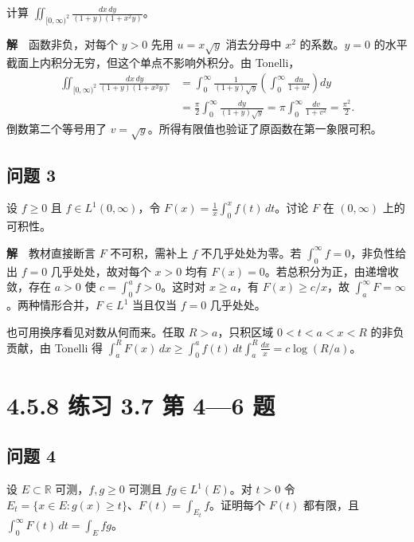 \documentclass[11pt,a4paper]{article}
\begin{document}
计算 \(\iint_{[0,\infty)^2}\frac{dx\,dy}{(1+y)(1+x^2y)}\)。

\textbf{解}　函数非负，对每个 \(y>0\) 先用 \(u=x\sqrt y\) 消去分母中
\(x^2\) 的系数。\(y=0\)
的水平截面上内积分无穷，但这个单点不影响外积分。由 Tonelli， \begin{equation*}
\begin{aligned}
\iint_{[0,\infty)^2}\frac{dx\,dy}{(1+y)(1+x^2y)}
&=\int_0^\infty\frac{1}{(1+y)\sqrt y}
       \left(\int_0^\infty\frac{du}{1+u^2}\right)dy\\
&=\frac{\pi}{2}\int_0^\infty\frac{dy}{(1+y)\sqrt y}
=\pi\int_0^\infty\frac{dv}{1+v^2}=\frac{\pi^2}{2}.
\end{aligned}
\end{equation*} 倒数第二个等号用了
\(v=\sqrt y\)。所得有限值也验证了原函数在第一象限可积。

\subsection{问题 3}\label{ux95eeux9898-3}

设 \(f\ge0\) 且 \(f\in L^1(0,\infty)\)，令
\(F(x)=\frac1x\int_0^x f(t)\,dt\)。讨论 \(F\) 在 \((0,\infty)\)
上的可积性。

\textbf{解}　教材直接断言 \(F\) 不可积，需补上 \(f\) 不几乎处处为零。若
\(\int_0^\infty f=0\)，非负性给出 \(f=0\) 几乎处处，故对每个 \(x>0\)
均有 \(F(x)=0\)。若总积分为正，由递增收敛，存在 \(a>0\) 使
\(c=\int_0^a f>0\)。这时对 \(x\ge a\)，有 \(F(x)\ge c/x\)，故
\(\int_a^\infty F=\infty\)。两种情形合并，\(F\in L^1\) 当且仅当 \(f=0\)
几乎处处。

也可用换序看见对数从何而来。任取 \(R>a\)，只积区域 \(0<t<a<x<R\)
的非负贡献，由 Tonelli 得
\(\int_a^R F(x)\,dx\ge\int_0^a f(t)\,dt\int_a^R\frac{dx}{x}=c\log(R/a)\)。

\section[\S{}4.5.8 练习 3.7 第 4---6
题]{4.5.8 练习 3.7 第 4---6
题}\label{ux7ec3ux4e60-3.7-ux7b2c-46-ux9898}

\subsection{问题 4}\label{ux95eeux9898-4}

设 \(E\subset\mathbb R\) 可测，\(f,g\ge0\) 可测且 \(fg\in L^1(E)\)。对
\(t>0\) 令 \(E_t=\{x\in E:g(x)\ge t\}\)、\(F(t)=\int_{E_t}f\)。证明每个
\(F(t)\) 都有限，且 \(\int_0^\infty F(t)\,dt=\int_E fg\)。
\end{document}
